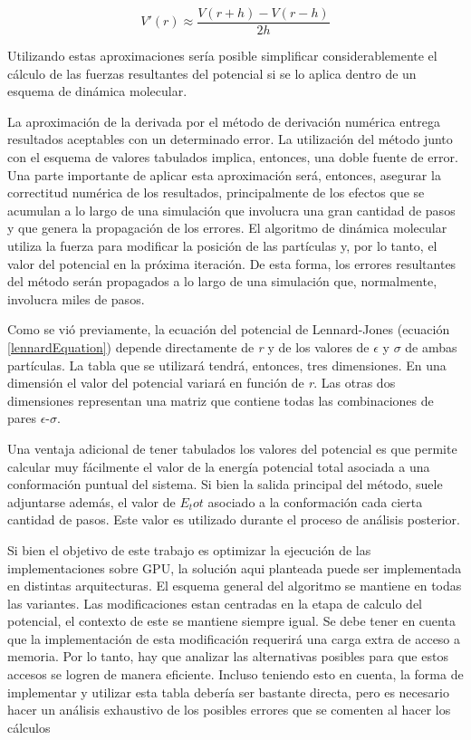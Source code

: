 \begin{equation}
 V'(r) \approx \frac{V(r+h)-V(r-h)}{2h}
\end{equation}

Utilizando estas aproximaciones sería posible simplificar considerablemente el cálculo de las fuerzas resultantes del potencial si se lo aplica dentro de un esquema de dinámica molecular.

La aproximación de la derivada por el método de derivación numérica entrega resultados aceptables con un determinado error. 
La utilización del método junto con el esquema de valores tabulados implica, entonces, una doble fuente de error. 
Una parte importante de aplicar esta aproximación será, entonces, asegurar la correctitud numérica de los resultados, 
principalmente de los efectos que se acumulan a lo largo de una simulación que involucra una gran cantidad de pasos y que genera la propagación de los errores.
El algoritmo de dinámica molecular utiliza la fuerza para modificar la posición de las partículas y, por lo tanto, el valor del potencial en la próxima iteración. 
De esta forma, los errores resultantes del método serán propagados a lo largo de una simulación que, normalmente, involucra miles de pasos.

Como se vió previamente, la ecuación del potencial de Lennard-Jones (ecuación \ref{lennardEquation}) depende directamente de \textit{r} y de los valores de $\epsilon$ y $\sigma$ de ambas partículas.
La tabla que se utilizará tendrá, entonces, tres dimensiones. En una dimensión el valor del potencial variará en función de \textit{r}.
Las otras dos dimensiones representan una matriz que contiene todas las combinaciones de pares $\epsilon$-$\sigma$.

Una ventaja adicional de tener tabulados los valores del potencial es que permite calcular muy fácilmente el valor de la energía potencial total asociada a una conformación puntual del sistema.
Si bien la salida principal del método, suele adjuntarse además, el valor de $E_tot$ asociado a la conformación cada cierta cantidad de pasos. Este valor es utilizado durante el proceso de análisis posterior.

Si bien el objetivo de este trabajo es optimizar la ejecución de las implementaciones sobre GPU, la solución aqui planteada puede ser implementada en distintas arquitecturas.
El esquema general del algoritmo se mantiene en todas las variantes. Las modificaciones estan centradas en la etapa de calculo del potencial, el contexto de este se mantiene siempre igual.
Se debe tener en cuenta que la implementación de esta modificación requerirá una carga extra de acceso a memoria. 
Por lo tanto, hay que analizar las alternativas posibles para que estos accesos se logren de manera eficiente.
Incluso teniendo esto en cuenta, la forma de implementar y utilizar esta tabla debería ser bastante directa, pero es necesario hacer un análisis exhaustivo de los posibles errores que se comenten al hacer los cálculos


